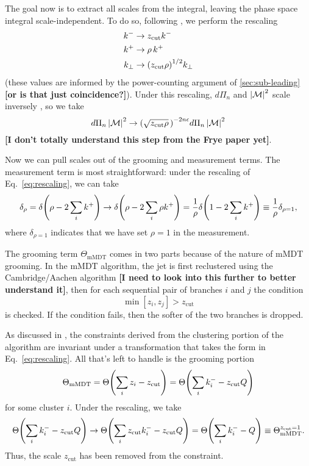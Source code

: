 \documentclass[11pt,twoside,reqno]{amsart}
\theoremstyle{plain}
\theoremstyle{remark}
\theoremstyle{definition}
\theoremstyle{remark}
\theoremstyle{definition}
\theoremstyle{definition}
\newcommand{\cM}{\mathcal{M}}
\newcommand{\zcut}{z_\mathrm{cut}}
\newcommand{\mMDT}{\mathrm{mMDT}}
\begin{document}
	The goal now is to extract all scales from the integral, leaving the phase space integral scale-independent. To do so, following \cite{frye_factorization_2016}, we perform the rescaling
	\begin{equation}\label{eq:rescaling}
	\begin{aligned}
		k^- &\to \zcut k^- \\
		k^+ &\to \rho\,k^+ \\
		k_\perp &\to \qty(\zcut \rho)^{1/2} k_\perp
	\end{aligned}
	\end{equation}
	(these values are informed by the power-counting argument of \ref{sec:sub-leading} {\color{red}\textbf{[or is that just coincidence?]}}). Under this rescaling, $d\Pi_n$ and $\abs{\cM}^2$ scale inversely \cite{frye_factorization_2016}, so we take
	\begin{equation}
		d\Pi_n\, \abs{\cM}^2 \to \qty(\sqrt{\zcut \rho}\,)^{-2n\epsilon} d\Pi_n\,\abs{\cM}^2
	\end{equation}
	{\color{red}\textbf{[I don't totally understand this step from the Frye paper yet]}}.

	Now we can pull scales out of the grooming and measurement terms. The measurement term is most straightforward: under the rescaling of Eq.\ \ref{eq:rescaling}, we can take
	\begin{equation}
		\delta_\rho = \delta\qty(\rho - 2\sum_i k^+) \to \delta\qty(\rho - 2\sum_i \rho k^+) = \frac{1}{\rho}\delta\qty(1 - 2\sum_i k^+) \equiv \frac{1}{\rho} \delta_{\rho = 1},
	\end{equation}
	where $\delta_{\rho = 1}$ indicates that we have set $\rho = 1$ in the measurement.

	The grooming term $\Theta_\mMDT$ comes in two parts because of the nature of mMDT grooming. In the mMDT algorithm, the jet is first reclustered using the Cambridge/Aachen algorithm \cite{dasgupta_towards_2013,frye_factorization_2016} {\color{red}\textbf{[I need to look into this further to better understand it]}}, then for each sequential pair of branches $i$ and $j$ the condition
	\begin{equation}
		\min[z_i, z_j] > \zcut
	\end{equation}
	is checked. If the condition fails, then the softer of the two branches is dropped.

	As discussed in \cite{frye_factorization_2016}, the constraints derived from the clustering portion of the algorithm are invariant under a transformation that takes the form in Eq.\ \ref{eq:rescaling}. All that's left to handle is the grooming portion
	\begin{equation}
		\Theta_\mMDT = \Theta\qty(\sum_i z_i - \zcut) = \Theta\qty(\sum_i k_i^- - \zcut Q)
	\end{equation}
	for some cluster $\qty{i}$. Under the rescaling, we take
	\begin{equation}
		\Theta\qty(\sum_i k_i^- - \zcut Q) \to \Theta\qty(\sum_i \zcut k_i^- - \zcut Q) = \Theta\qty(\sum_i k_i^- - Q) \equiv \Theta_\mMDT^{\zcut = 1}.
	\end{equation}
	Thus, the scale $\zcut$ has been removed from the constraint.
\end{document}
